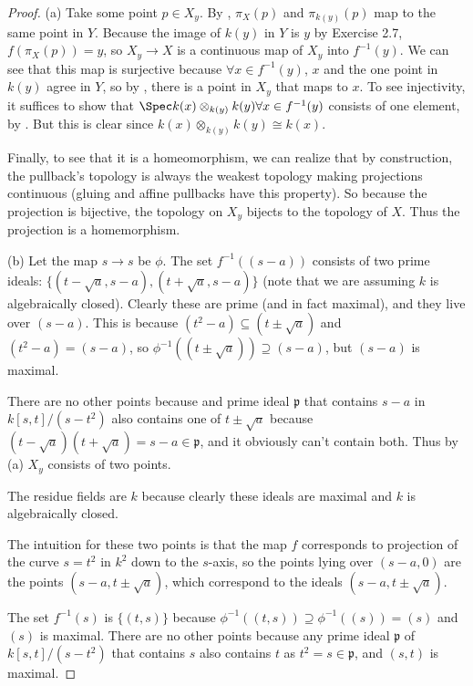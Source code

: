 \begin{proof}
	(a) Take some point $p \in X_y $.
	By , $\pi _X(p) $ and $\pi_{k(y)}(p) $ map to the same point in $Y $.
	Because the image of $k(y) $ in $Y $ is $y $ by Exercise 2.7, $f(\pi _X(p)) = y $, so $X_y \to X $ is a continuous map of $X_y $ into $f^{-1}(y) $.
	We can see that this map is surjective because $\forall x \in f^{-1}(y) $, $x $ and the one point in $k(y) $ agree in $Y $, so by , there is a point in $X_y $ that maps to $x $.
	To see injectivity, it suffices to show that $\Spec k(x) \otimes_{k(y)} k(y)\forall x \in f^{-1}(y) $ consists of one element, by .
	But this is clear since $k(x) \otimes_{k(y)} k(y) \cong k(x) $.

	Finally, to see that it is a homeomorphism, we can realize that by construction, the pullback's topology is always the weakest topology making projections continuous (gluing and affine pullbacks have this property).
	So because the projection is bijective, the topology on $X_y $ bijects to the topology of $X $.
	Thus the projection is a homemorphism.

	(b) Let the map $s\to s $ be $\phi  $.
	The set $f^{-1}((s - a)) $ consists of two prime ideals: $\{(t - \sqrt{a}, s-a), (t+\sqrt{a}, s-a)\}   $ (note that we are assuming $k $ is algebraically closed).
	Clearly these are prime (and in fact maximal), and they live over $(s-a) $.
	This is because $(t^2-a) \subseteq (t\pm \sqrt{a} ) $ and $(t^2-a) = (s-a) $, so $\phi^{-1}((t \pm \sqrt{a}) ) \supseteq (s-a)$, but $(s-a) $ is maximal.

	There are no other points because and prime ideal $\mathfrak{p} $ that contains $s-a $ in $k[s,t] / (s-t^2) $ also contains one of $t\pm \sqrt{a}  $ because $(t-\sqrt{a} )(t+\sqrt{a} ) = s-a \in \mathfrak{p} $, and it obviously can't contain both.
	Thus by (a) $X_y $ consists of two points.

	The residue fields are $k $ because clearly these ideals are maximal and $k $ is algebraically closed.

	The intuition for these two points is that the map $f $ corresponds to projection of the curve $s = t^2 $ in $k^2 $ down to the $s $-axis, so the points lying over $(s-a,0) $ are the points $(s-a,t\pm \sqrt{a} ) $, which correspond to the ideals $(s-a, t\pm \sqrt{a} ) $.

	The set $f^{-1}(s) $ is $\{(t,s)\}   $ because $\phi ^{-1}((t,s)) \supseteq \phi ^{-1}((s)) = (s)$ and $(s) $ is maximal.
	There are no other points because any prime ideal $\mathfrak{p} $ of $k[s,t] / (s-t^2) $ that contains $s $ also contains $t $ as $t^2 = s \in \mathfrak{p} $, and $(s,t) $ is maximal.
\end{proof}

